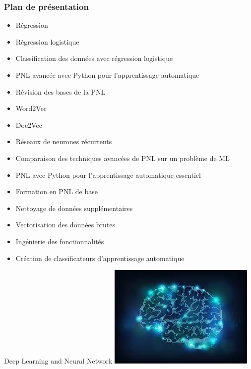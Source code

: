 \documentclass{beamer}
\begin{document}
\begin{frame}
	\frametitle{Plan de présentation}
	\begin{itemize}
		\item Régression
		\item Régression logistique
		\item Classification des données avec régression logistique
		\item PNL avancée avec Python pour l'apprentissage automatique
		\item Révision des bases de la PNL
		\item Word2Vec
		\item Doc2Vec
		\item Réseaux de neurones récurrents
		\item Comparaison des techniques avancées de PNL sur un problème de ML
		\item PNL avec Python pour l'apprentissage automatique essentiel
		\item Formation en PNL de base
		\item Nettoyage de données supplémentaires
		\item Vectorisation des données brutes
		\item Ingénierie des fonctionnalités
		\item Création de classificateurs d'apprentissage automatique
	\end{itemize}
\end{frame}

{
\begin{frame}{Deep Learning and Neural Network}
	\centering
	\includegraphics[width=\linewidth]{deepll.jpeg}
\end{frame}
}
\end{document}
